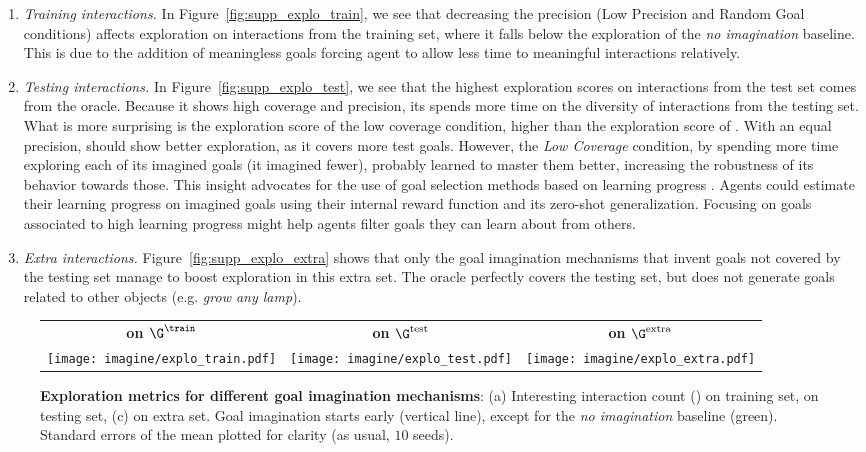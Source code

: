 \begin{enumerate}
    \item \textit{Training interactions.} In Figure~\ref{fig:supp_explo_train}, we see that decreasing the precision (Low Precision and Random Goal conditions) affects exploration on interactions from the training set, where it falls below the exploration of the \textit{no imagination} baseline. This is due to the addition of meaningless goals forcing agent to allow less time to meaningful interactions relatively.
    \item \textit{Testing interactions.}
    In Figure~\ref{fig:supp_explo_test}, we see that the highest exploration scores on interactions from the test set comes from the oracle. Because it shows high coverage and precision, its spends more time on the diversity of interactions from the testing set. What is more surprising is the exploration score of the low coverage condition, higher than the exploration score of \CGH. With an equal precision, \CGH should show better exploration, as it covers more test goals. However, the \textit{Low Coverage} condition, by spending more time exploring each of its imagined goals (it imagined fewer), probably learned to master them better, increasing the robustness of its behavior towards those. This insight advocates for the use of goal selection methods based on learning progress \cite{forestier2016modular,curious}. Agents could estimate their learning progress on imagined goals using their internal reward function and its zero-shot generalization. Focusing on goals associated to high learning progress might help agents filter goals they can learn about from others.
    
    \item \textit{Extra interactions.} Figure~\ref{fig:supp_explo_extra} shows that only the goal imagination mechanisms that invent goals not covered by the testing set manage to boost exploration in this extra set. The oracle perfectly covers the testing set, but does not generate goals related to other objects (e.g. \textit{grow any lamp}). 
\end{enumerate} 


\begin{figure*}[!h]
  \centering
\begin{tabular}{ccc}
	\textbf{\itwoc on $\G^\train$ } & \textbf{\itwoc on $\G^\text{test}$}& \textbf{\itwoc on $\G^\text{extra}$} \\
	\texttt{[image: imagine/explo\_train.pdf]} & \texttt{[image: imagine/explo\_test.pdf]} &
	\texttt{[image: imagine/explo\_extra.pdf]}
\end{tabular}

  \caption{\textbf{Exploration metrics for different goal imagination mechanisms}: (a) Interesting interaction count (\itwoc) on training set, \itwoc on testing set, (c) \itwoc on extra set.  Goal imagination starts early (vertical line), except for the \textit{no imagination} baseline (green). Standard errors of the mean plotted for clarity (as usual, $10$ seeds).}
  \label{fig:suppl_explo_metrics_goalim}
\end{figure*}   

